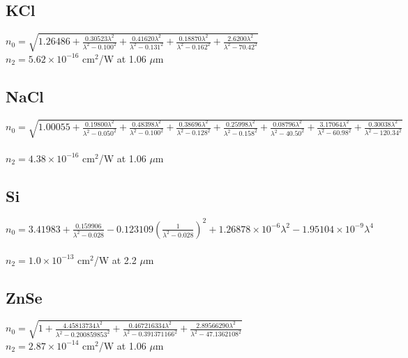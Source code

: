 \documentclass{report}
\begin{document}
\subsection*{KCl}
$n_0=\sqrt{1.26486+\frac{0.30523\lambda^2}{\lambda^2-0.100^2}+\frac{0.41620\lambda^2}{\lambda^2-0.131^2}+\frac{0.18870\lambda^2}{\lambda^2-0.162^2}+\frac{2.6200\lambda^2}{\lambda^2-70.42^2}}$ \cite{Li-1976}\\
$n_2 = 5.62\times 10^{-16}$ cm$^2$/W at 1.06 $\mu$m \cite{Sheik-Bahae-1991}
\subsection*{NaCl}
$n_0=\sqrt{1.00055+\frac{0.19800\lambda^2}{\lambda^2-0.050^2}+\frac{0.48398\lambda^2}{\lambda^2-0.100^2}+\frac{0.38696\lambda^2}{\lambda^2-0.128^2}+\frac{0.25998\lambda^2}{\lambda^2-0.158^2}+\frac{0.08796\lambda^2}{\lambda^2-40.50^2}+\frac{3.17064\lambda^2}{\lambda^2-60.98^2}+\frac{0.30038\lambda^2}{\lambda^2-120.34^2}}$ \cite{Li-1976}\\
$n_2 = 4.38\times 10^{-16}$ cm$^2$/W at 1.06 $\mu$m \cite{Sheik-Bahae-1991}
\subsection*{Si}
$n_0=3.41983+\frac{0.159906}{\lambda^2-0.028}-0.123109\left(\frac{1}{\lambda^2-0.028}\right)^2+1.26878\times 10^{-6}\lambda^2-1.95104\times 10^{-9}\lambda^4$ \cite{Edwards-1980}\\
$n_2 = 1.0\times 10^{-13}$ cm$^2$/W at 2.2 $\mu$m \cite{Bristow-2007}
\subsection*{ZnSe}
$n_0=\sqrt{1+\frac{4.45813734\lambda^2}{\lambda^2-0.200859853^2}+\frac{0.467216334\lambda^2}{\lambda^2-0.391371166^2}+\frac{2.89566290\lambda^2}{\lambda^2-47.1362108^2}}$ \cite{Tatian-1984}\\
$n_2 = 2.87\times 10^{-14}$ cm$^2$/W at 1.06 $\mu$m \cite{Sheik-Bahae-1991}

                          


                          
\end{document}

